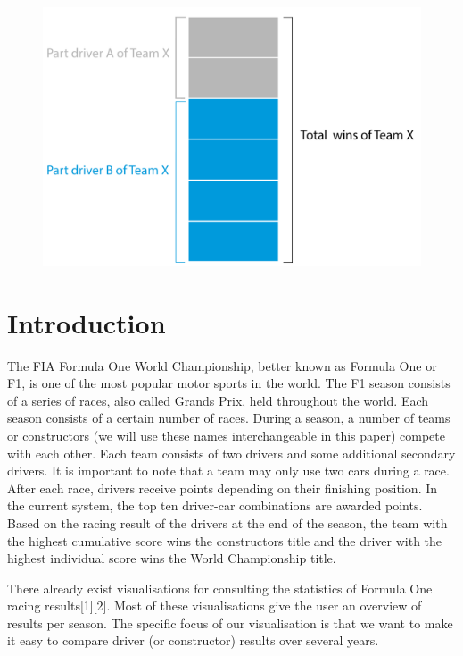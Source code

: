 \documentclass{sigchi}
\begin{document}
\begin{figure}
\begin{center}
\includegraphics[width=\columnwidth]{images/stackedbar.pdf}
\end{center}
\end{figure}

\section{Introduction}
The FIA Formula One World Championship, better known as Formula One or F1, is one of the most popular motor sports in the world. The F1 season consists of a series of races, also called Grands Prix, held throughout the world. Each season consists of a certain number of races. During a season, a number of teams or constructors (we will use these names interchangeable in this paper) compete with each other. Each team consists of two drivers and some additional secondary drivers. It is important to note that a team may only use two cars during a race. After each race, drivers receive points depending on their finishing position. In the current system, the top ten driver-car combinations are awarded points. Based on the racing result of the drivers at the end of the season, the team with the highest cumulative score wins the constructors title and the driver with the highest individual score wins the World Championship title.
 
There already exist visualisations for consulting the statistics of Formula One racing results[1][2]. Most of these visualisations give the user an overview of results per season. The specific focus of our visualisation is that we want to make it easy to compare driver (or constructor) results over several years.
 
\end{document}
